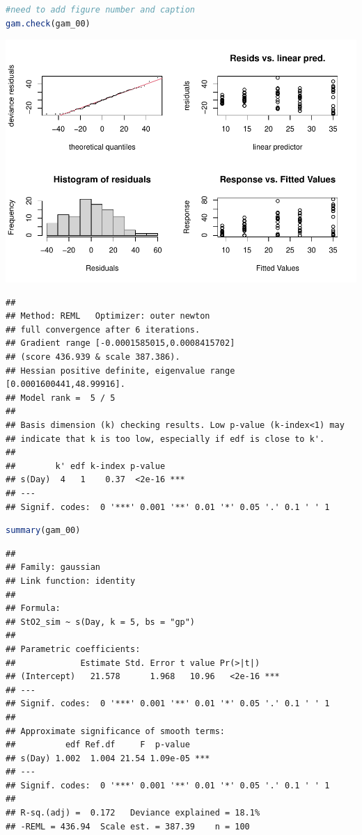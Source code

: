 \documentclass[
]{article}
\begin{document}
\begin{lstlisting}[language=R]
#need to add figure number and caption
gam.check(gam_00)
\end{lstlisting}

\includegraphics{Full_document_files/figure-latex/first-GAM-check-1}

\begin{lstlisting}
## 
## Method: REML   Optimizer: outer newton
## full convergence after 6 iterations.
## Gradient range [-0.0001585015,0.0008415702]
## (score 436.939 & scale 387.386).
## Hessian positive definite, eigenvalue range [0.0001600441,48.99916].
## Model rank =  5 / 5 
## 
## Basis dimension (k) checking results. Low p-value (k-index<1) may
## indicate that k is too low, especially if edf is close to k'.
## 
##        k' edf k-index p-value    
## s(Day)  4   1    0.37  <2e-16 ***
## ---
## Signif. codes:  0 '***' 0.001 '**' 0.01 '*' 0.05 '.' 0.1 ' ' 1
\end{lstlisting}

\begin{lstlisting}[language=R]
summary(gam_00)
\end{lstlisting}

\begin{lstlisting}
## 
## Family: gaussian 
## Link function: identity 
## 
## Formula:
## StO2_sim ~ s(Day, k = 5, bs = "gp")
## 
## Parametric coefficients:
##             Estimate Std. Error t value Pr(>|t|)    
## (Intercept)   21.578      1.968   10.96   <2e-16 ***
## ---
## Signif. codes:  0 '***' 0.001 '**' 0.01 '*' 0.05 '.' 0.1 ' ' 1
## 
## Approximate significance of smooth terms:
##          edf Ref.df     F  p-value    
## s(Day) 1.002  1.004 21.54 1.09e-05 ***
## ---
## Signif. codes:  0 '***' 0.001 '**' 0.01 '*' 0.05 '.' 0.1 ' ' 1
## 
## R-sq.(adj) =  0.172   Deviance explained = 18.1%
## -REML = 436.94  Scale est. = 387.39    n = 100
\end{lstlisting}
\end{document}
